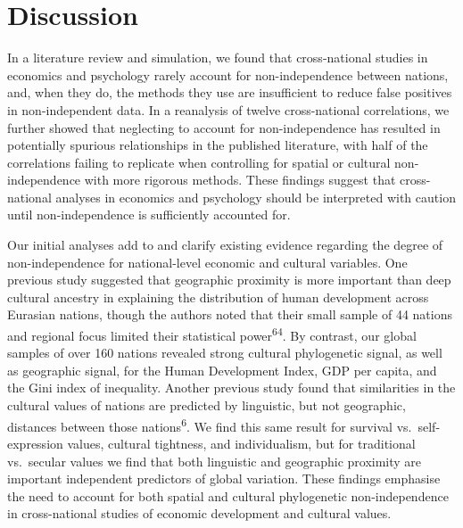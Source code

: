 \documentclass[
  man,floatsintext]{apa6}
\begin{document}
\hypertarget{discussion}{%
\section{Discussion}\label{discussion}}

In a literature review and simulation, we found that cross-national studies in economics and psychology rarely account for non-independence between nations, and, when they do, the methods they use are insufficient to reduce false positives in non-independent data. In a reanalysis of twelve cross-national correlations, we further showed that neglecting to account for non-independence has resulted in potentially spurious relationships in the published literature, with half of the correlations failing to replicate when controlling for spatial or cultural non-independence with more rigorous methods. These findings suggest that cross-national analyses in economics and psychology should be interpreted with caution until non-independence is sufficiently accounted for.

Our initial analyses add to and clarify existing evidence regarding the degree of non-independence for national-level economic and cultural variables. One previous study suggested that geographic proximity is more important than deep cultural ancestry in explaining the distribution of human development across Eurasian nations, though the authors noted that their small sample of 44 nations and regional focus limited their statistical power\textsuperscript{64}. By contrast, our global samples of over 160 nations revealed strong cultural phylogenetic signal, as well as geographic signal, for the Human Development Index, GDP per capita, and the Gini index of inequality. Another previous study found that similarities in the cultural values of nations are predicted by linguistic, but not geographic, distances between those nations\textsuperscript{6}. We find this same result for survival vs.~self-expression values, cultural tightness, and individualism, but for traditional vs.~secular values we find that both linguistic and geographic proximity are important independent predictors of global variation. These findings emphasise the need to account for both spatial and cultural phylogenetic non-independence in cross-national studies of economic development and cultural values.
\end{document}
